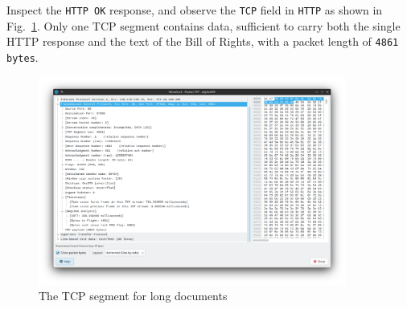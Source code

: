 \documentclass{cshwk}
\begin{document}
Inspect the \texttt{HTTP OK} response, and observe the \texttt{TCP} field in \texttt{HTTP} as shown in Fig.~\ref{fig:http-long-documents-response-tcp}. Only one TCP segment contains data, sufficient to carry both the single HTTP response and the text of the Bill of Rights, with a packet length of \texttt{4861 bytes}.

\begin{figure}[htbp]
    \centering
    \includegraphics[width=0.9\textwidth]{lab2-11.png}
    \caption{The TCP segment for long documents}
    \label{fig:http-long-documents-response-tcp}
\end{figure}
\end{document}
